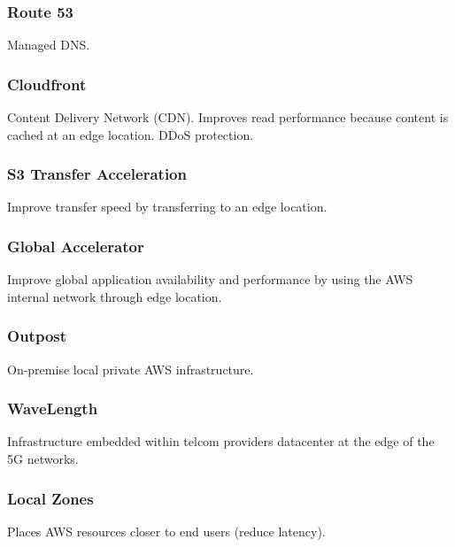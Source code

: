 \subsubsection{Route 53}
Managed DNS\@.

\subsubsection{Cloudfront}
Content Delivery Network (CDN).
Improves read performance because content is cached at an edge location.
DDoS protection.

\subsubsection{S3 Transfer Acceleration}
Improve transfer speed by transferring to an edge location.

\subsubsection{Global Accelerator}
Improve global application availability and performance by using the AWS internal network through edge location.

\subsubsection{Outpost}
On-premise local private AWS infrastructure.

\subsubsection{WaveLength}
Infrastructure embedded within telcom providers datacenter at the edge of the 5G networks.

\subsubsection{Local Zones}
Places AWS resources closer to end users (reduce latency).

